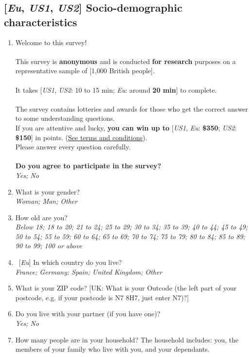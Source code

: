 \subsection*{[\textit{Eu}, \textit{US1}, \textit{US2}] Socio-demographic characteristics}
\begin{enumerate}
\item Welcome to this survey!\\
\\
This survey is \textbf{anonymous} and is conducted \textbf{for research} purposes on a representative sample of [1,000 British people].\\
 \\
It takes [\textit{US1}, \textit{US2}: 10 to 15 min; \textit{Eu}: around \textbf{20 min}] to complete.  \\
 \\
The survey contains lotteries and awards for those who get the correct answer to some understanding questions.\\
If you are attentive and lucky, \textbf{you can win up to }[\textit{US1}, \textit{Eu}: \textbf{\$350}; \textit{US2}: \textbf{\$150}] in points. (\href{https://uvafeb.eu.qualtrics.com/WRQualtricsControlPanel/File.php?F=F_cBZAXTgNktGZbee&download=1}{See terms and conditions}).    \\
Please answer every question carefully.  \\
 \\
\textbf{Do you agree to participate in the survey?}
\\ \textit{Yes; No}
\item What is your gender?
\\ \textit{Woman; Man; Other}
\item How old are you?
\\ \textit{Below 18; 18 to 20; 21 to 24; 25 to 29; 30 to 34; 35 to 39; 40 to 44; 45 to 49; 50 to 54; 55 to 59; 60 to 64; 65 to 69; 70 to 74; 75 to 79; 80 to 84; 85 to 89; 90 to 99; 100 or above}
\item ~[\textit{Eu}] In which country do you live?
\\ \textit{France; Germany; Spain; United Kingdom; Other}
\item What is your ZIP code? [UK: What is your Outcode (the left part of your postcode, e.g. if your postcode is N7 8H7, just enter N7)?]
\item \label{q:partner} Do you live with your partner (if you have one)?
\\ \textit{Yes; No}
\item How many people are in your household? The household includes: you, the members of your family who live with you, and your dependants. %

\end{enumerate}
